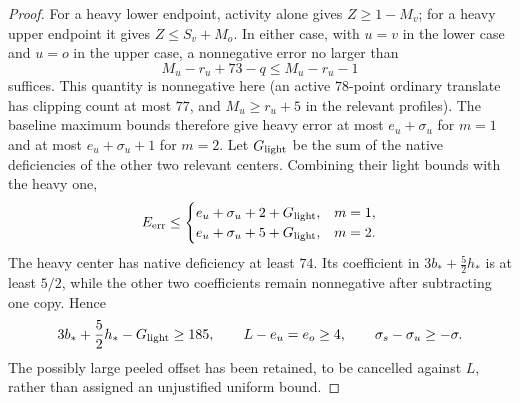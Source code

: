 \documentclass[11pt,letterpaper]{article}
\theoremstyle{definition}\newtheorem{definition}[theorem]{Definition}
\begin{document}
\begin{proof}
For a heavy lower endpoint, activity alone gives $Z\ge1-M_v$;
for a heavy upper endpoint it gives $Z\le S_v+M_o$. In either case,
with $u=v$ in the lower case and $u=o$ in the upper case, a
nonnegative error no larger than
\[
 M_u-r_u+73-q\le M_u-r_u-1
\]
suffices. This quantity is nonnegative here (an active $78$-point
ordinary translate has clipping count at most $77$, and
$M_u\ge r_u+5$ in the relevant profiles). The baseline maximum bounds
therefore give heavy error at most $e_u+\sigma_u$ for $m=1$ and
at most $e_u+\sigma_u+1$ for $m=2$.
Let $G_{\rm light}$ be the sum of the native deficiencies of the other
two relevant centers. Combining their light bounds with the heavy one,
\begin{equation}\label{eq:p3-a1-one-heavy}
 E_{\rm err}\le
 \begin{cases}e_u+\sigma_u+2+G_{\rm light},&m=1,\\
               e_u+\sigma_u+5+G_{\rm light},&m=2.
 \end{cases}
\end{equation}
The heavy center has native deficiency at least $74$. Its coefficient
in $3b_*+\tfrac52h_*$ is at least $5/2$, while the
other two coefficients remain nonnegative after subtracting one copy.
Hence
\begin{equation}\label{eq:p3-a1-heavy-credit}
 3b_*+\frac52h_*-G_{\rm light}\ge185,
 \qquad L-e_u=e_o\ge4,\qquad
 \sigma_s-\sigma_u\ge-\sigma.
\end{equation}
The possibly large peeled offset has been retained, to be cancelled
against $L$, rather than assigned an unjustified uniform bound.


\end{proof}
\end{document}
